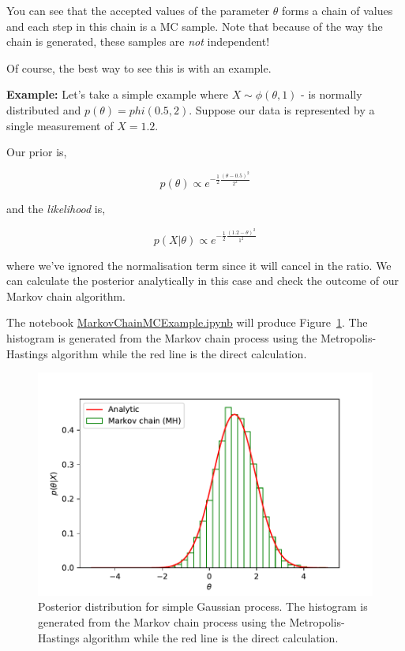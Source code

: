 You can see that the accepted values of the parameter $\theta$ forms a 
chain of values and each step in this chain is a MC sample. Note that 
because of the way the chain is generated, these  samples are \emph{not} 
independent!

Of course, the best way to see this is with an example.   

\begin{tcolorbox}[colback=backblue]
    \textbf{Example:} Let's take a simple example 
    where $X\sim \phi(\theta,1)$ - is normally 
    distributed and $p(\theta)=phi(0.5,2)$. Suppose 
    our data is represented by a single measurement of $X=1.2$.

    Our prior is,
    
    \begin{equation}
    p(\theta)\propto e^{-\frac{1}{2}\frac{(\theta-0.5)^{2}}{2^{2}}}
    \end{equation}
    
    and the \emph{likelihood} is, 
    
    \begin{equation}
    p(X|\theta)\propto e^{-\frac{1}{2}\frac{(1.2-\theta)^{2}}{1^{2}}}
    \end{equation}
    
    where we've ignored the normalisation term since it will cancel 
    in the ratio. We can calculate the posterior analytically in this 
    case and check the outcome  of our Markov chain algorithm. 

    The notebook \href{https://github.com/nucleosynthesis/PGStatistics/blob/main/notebooks/MarkovChainMCExample.ipynb}{MarkovChainMCExample.ipynb} 
    will produce Figure~\ref{fig:mcmcmhex}. The histogram is generated 
    from the Markov chain process using the Metropolis-Hastings algorithm 
    while the red line is the direct calculation. 
\end{tcolorbox}

\begin{figure}[hbt!]
    \centering
    \includegraphics[width=\textwidth]{figures/Probability/markovchainexample.pdf}
    \caption{Posterior distribution  for simple Gaussian process. 
    The histogram is generated 
    from the Markov chain process using the 
    Metropolis-Hastings algorithm 
    while the red line is the direct calculation. }
    \label{fig:mcmcmhex}
\end{figure}
